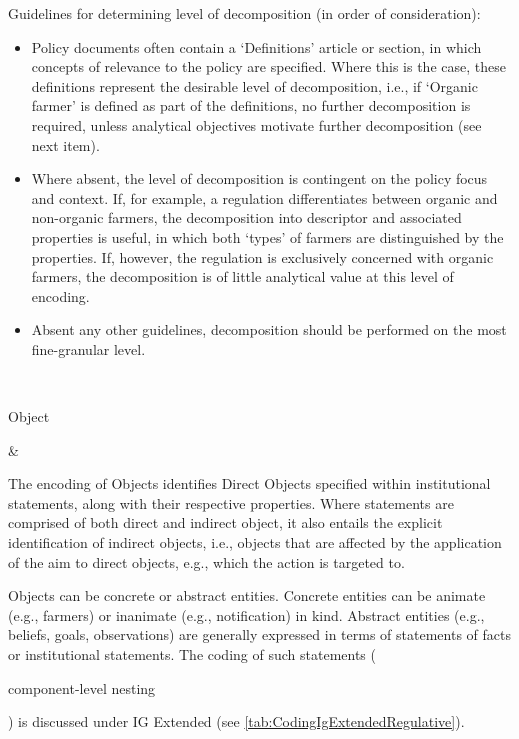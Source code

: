 \begin{landscape}
\begin{longtable}{\tabledims}
{\sp

Guidelines for determining level of decomposition (in order of consideration):

\begin{itemize}
\item Policy documents often contain a `Definitions' article or section, in which concepts of relevance to the policy are specified. Where this is the case, these definitions represent the desirable level of decomposition, i.e., if `Organic farmer' is defined as part of the definitions, no further decomposition is required, unless analytical objectives motivate further decomposition (see next item).

\item Where absent, the level of decomposition is contingent on the policy focus and context. If, for example, a regulation differentiates between organic and non-organic farmers, the decomposition into descriptor and associated properties is useful, in which both `types' of farmers are distinguished by the properties. If, however, the regulation is exclusively concerned with organic farmers, the decomposition is of little analytical value at this level of encoding.

\item Absent any other guidelines, decomposition should be performed on the most fine-granular level.
\end{itemize}} \\

\newpage

\midrule
\begin{emp}Object\end{emp} & {The encoding of Objects identifies Direct Objects specified within institutional statements, along with their respective properties. Where statements are comprised of both direct and indirect object, it also entails the explicit identification of indirect objects, i.e., objects that are affected by the application of the aim to direct objects, e.g., which the action is targeted to. 

Objects can be concrete or abstract entities. Concrete entities can be animate (e.g., farmers) or inanimate (e.g., notification) in kind. Abstract entities (e.g., beliefs, goals, observations) are generally expressed in terms of statements of facts or institutional statements. The coding of such statements (\begin{emp}component-level nesting\end{emp}) is discussed under IG Extended (see \cref{tab:CodingIgExtendedRegulative}).  

}
\end{longtable}
\end{landscape}
